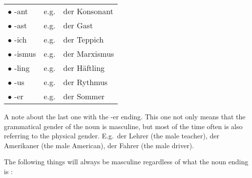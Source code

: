 \documentclass[a4paper,twocolumn,10pt]{article}
\newcommand{\newpar}
{\par \vspace{0.3cm}}
\newcommand{\tabularxtable}[3]
{

	\vspace{0.5cm}
	\nolinenumbers

	\begin{tabularx}{#1}{#2}
		#3
	\end{tabularx}

	\linenumbers
	\vspace{0.5cm}
}
\begin{document}

\tabularxtable
{ 0.95\linewidth }
{ lrX }
{

\rowcolor{white} $\bullet$ -ant   & e.g. & der Konsonant\\
\rowcolor{white} $\bullet$ -ast   & e.g. & der Gast     \\
\rowcolor{white} $\bullet$ -ich   & e.g. & der Teppich  \\
\rowcolor{white} $\bullet$ -ismus & e.g. & der Marxismus\\
\rowcolor{white} $\bullet$ -ling  & e.g. & der Häftling \\
\rowcolor{white} $\bullet$ -us    & e.g. & der Rythmus  \\
\rowcolor{white} $\bullet$ -er    & e.g. & der Sommer   \\

}


A note about the last one with the -er ending. This one not only means that the
grammatical gender of the noun is masculine, but most of the time often is also
referring to the physical gender. E.g.\ der Lehrer (the male teacher), der
Amerikaner (the male American), der Fahrer (the male driver).\newpar

The following things will always be masculine regardless of what the noun ending
is :

\end{document}
